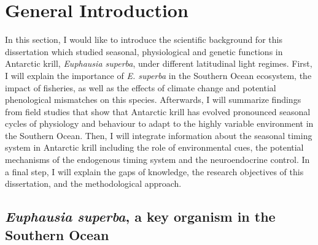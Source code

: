 
\chapter{General Introduction} %

\label{Intro} %


\newcommand{\keyword}[1]{\textbf{#1}}
\newcommand{\tabhead}[1]{\textbf{#1}}
\newcommand{\code}[1]{\texttt{#1}}
\newcommand{\file}[1]{\texttt{\bfseries#1}}
\newcommand{\option}[1]{\texttt{\itshape#1}}
\newcommand{\krilllatin}{\textit{Euphausia superba}}
\newcommand{\krilllatinshort}{\textit{E. superba}}

In this section, I would like to introduce the scientific background for this
dissertation which studied seasonal, physiological and genetic functions in
Antarctic krill, \textit{Euphausia superba}, under different latitudinal light
regimes. First, I will explain the importance of \textit{E. superba} in the
Southern Ocean ecosystem, the impact of fisheries, as well as the effects of
climate change and potential phenological mismatches on this species.
Afterwards, I will summarize findings from field studies that show that
Antarctic krill has evolved pronounced seasonal cycles of physiology and
behaviour to adapt to the highly variable environment in the Southern Ocean.
Then, I will integrate information about the seasonal timing system in
Antarctic krill including the role of environmental cues, the potential
mechanisms of the endogenous timing system and the neuroendocrine control. In a
final step, I will explain the gaps of knowledge, the research objectives of
this dissertation, and the methodological approach.

\section*{\textit{Euphausia superba}, a key organism in the Southern Ocean}

